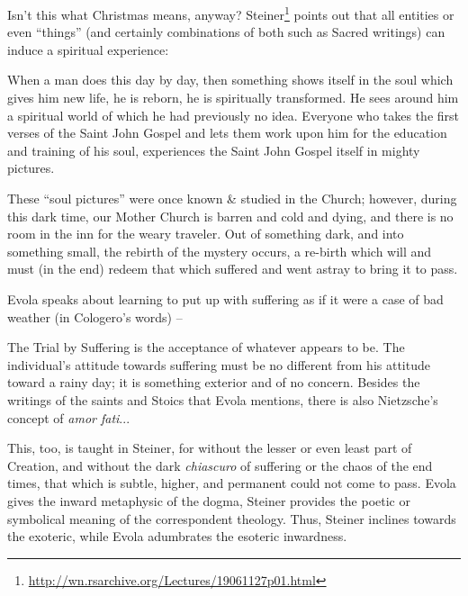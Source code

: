 Isn't this what Christmas means, anyway? Steiner\footnote{\url{http://wn.rsarchive.org/Lectures/19061127p01.html}} points out that all entities or even ``things'' (and certainly combinations of both such as Sacred writings) can induce a spiritual experience:

\begin{quotex}
When a man does this day by day, then something shows itself in the soul which gives him new life, he is reborn, he is spiritually transformed. He sees around him a spiritual world of which he had previously no idea. Everyone who takes the first verses of the Saint John Gospel and lets them work upon him for the education and training of his soul, experiences the Saint John Gospel itself in mighty pictures.
\end{quotex}


These ``soul pictures'' were once known \& studied in the Church; however, during this dark time, our Mother Church is barren and cold and dying, and there is no room in the inn for the weary traveler. Out of something dark, and into something small, the rebirth of the mystery occurs, a re-birth which will and must (in the end) redeem that which suffered and went astray to bring it to pass.

Evola speaks about learning to put up with suffering as if it were a case of bad weather (in Cologero's words) --

\begin{quotex}
The Trial by Suffering is the acceptance of whatever appears to be. The individual's attitude towards suffering must be no different from his attitude toward a rainy day; it is something exterior and of no concern. Besides the writings of the saints and Stoics that Evola mentions, there is also Nietzsche's concept of \emph{amor fati}... 
\end{quotex}


This, too, is taught in Steiner, for without the lesser or even least part of Creation, and without the dark \emph{chiascuro} of suffering or the chaos of the end times, that which is subtle, higher, and permanent could not come to pass. Evola gives the inward metaphysic of the dogma, Steiner provides the poetic or symbolical meaning of the correspondent theology. Thus, Steiner inclines towards the exoteric, while Evola adumbrates the esoteric inwardness.

